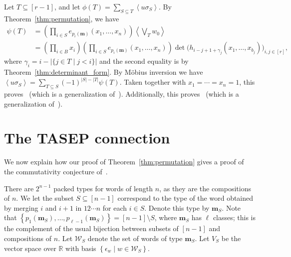 \documentclass[reqno]{amsart}
\newcommand{\0}{\phantom{c}}
\newcommand{\swt}[1]{\left\langle #1 \right\rangle} %
\newcommand{\mm}{\mathbf{m}}
\newcommand{\mcW}{\mathcal{W}}
\newcommand{\RR}{\mathbb{R}}
\let\sumnonlimits\sum
\let\prodnonlimits\prod
\renewcommand{\sum}{\sumnonlimits\limits}
\renewcommand{\prod}{\prodnonlimits\limits}
\newcommand{\set}[1]{\left\{ #1 \right\}}
\newcommand{\ive}[1]{\left[ #1 \right]}
\theoremstyle{plain}
\theoremstyle{definition}
\numberwithin{equation}{section}
\begin{document}
Let $T \subseteq \ive{r-1}$, and let $\phi(T) = \sum_{S \subseteq T} \swt{u \sigma_S}$.
By Theorem~\ref{thm:permutation}, we have
\begin{align*}
  \psi(T) & = \left(\prod_{i\in S} e_{p_i(\mm)}(x_1, \dotsc, x_n) \right) \swt{ \bigvee_T w_0}
  \\ & = \left( \prod_{i\in B} x_i \right) \left(\prod_{i\in S} e_{p_i(\mm)}(x_1, \dotsc, x_n) \right) \det\bigl(h_{i-j+1+\gamma_j}(x_1, \dotsc, x_{b_j})\bigr)_{i, j \in \ive{r}},
\end{align*}
where $\gamma_i = i - \lvert \{j\in T \mid j < i \} \rvert$ and the second equality is by Theorem~\ref{thm:determinant_form}.
By M\"obius inversion we have $\swt{u \sigma_S} = \sum_{T\subseteq S} (-1)^{|S|-|T|} \psi(T)$.
Taken together with $x_1 = \cdots = x_n = 1$, this proves~\cite[Conj.~3.10]{AasLin17} (which is a generalization of~\cite[Conj.~3.9]{AasLin17}).
Additionally, this proves~\cite[Conj.~3.6]{AasLin17} (which is a generalization of~\cite[Conj.~3.4]{AasLin17}).










\section{The TASEP connection}
\label{sec:tasep}

We now explain how our proof of Theorem~\ref{thm:permutation} gives a proof of the commutativity conjecture of~\cite{AAMP}.

There are $2^{n-1}$ packed types for words of length $n$, as they are the compositions of $n$.
We let the subset $S \subseteq [n-1]$ correspond to the type of the word obtained by merging $i$ and $i+1$ in $12 \dotsm n$ for each $i \in S$.
Denote this type by $\mm_S$.
Note that $\set{p_1(\mm_S), \dotsc, p_{\ell-1}(\mm_S)} = [n-1] \setminus S$, where $\mm_S$ has $\ell$ classes; this is the complement of the usual bijection between subsets of $\ive{n-1}$ and compositions of $n$.
Let $\mcW_S$ denote the set of words of type $\mm_S$.
Let $V_S$ be the vector space over $\RR$ with basis $\set{\epsilon_w \mid w \in \mcW_S}$.
\end{document}
